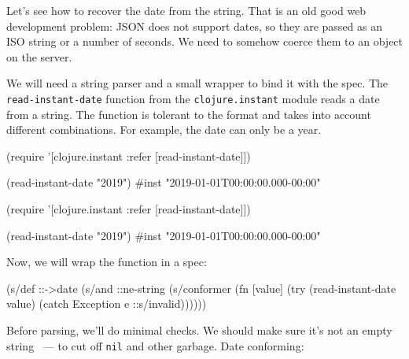 
Let's see how to recover the date from the string. That is an old good web development problem: JSON does not support dates, so they are passed as an ISO string or a number of seconds. We need to somehow coerce them to an object on the server.


\mnoindent
We will need a string parser and a small wrapper to bind it with the spec. The \verb|read-instant-date| function from the \verb|clojure.instant| module reads a date from a string. The function is tolerant to the format and takes into account different combinations. For example, the date can only be a year.


\ifx\DEVICETYPE\MOBILE

\begin{english}
  \begin{clojure}
(require '[clojure.instant
           :refer [read-instant-date]])

(read-instant-date "2019")
#inst "2019-01-01T00:00:00.000-00:00"
  \end{clojure}
\end{english}

\else

\begin{english}
  \begin{clojure}
(require '[clojure.instant :refer [read-instant-date]])

(read-instant-date "2019")
#inst "2019-01-01T00:00:00.000-00:00"
  \end{clojure}
\end{english}

\fi

Now, we will wrap the function in a spec:

\begin{english}
  \begin{clojure}
(s/def ::->date
  (s/and
   ::ne-string
   (s/conformer
    (fn [value]
      (try
        (read-instant-date value)
        (catch Exception e
          ::s/invalid))))))
  \end{clojure}
\end{english}

Before parsing, we'll do minimal checks. We should make sure it's not an empty string ~--- to cut off \verb|nil| and other garbage. Date conforming:

